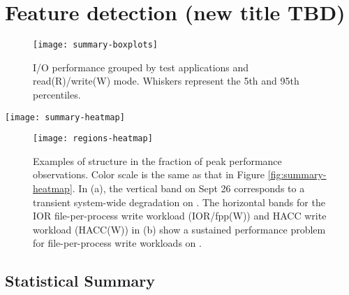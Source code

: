 \section{Feature detection (new title TBD)}  \label{sec:features}

\begin{figure}
    \centering
    \texttt{[image: summary-boxplots]}
    \vspace{-.15in}
    \caption{I/O performance grouped by test applications and read(R)/write(W) mode.  Whiskers represent the 5th and 95th percentiles.}
    \label{fig:summary-boxplots}
\end{figure}


\begin{figure*}
    \centering
    \texttt{[image: summary-heatmap]}
    \vspace{-.2in}
    \caption{Performance of daily benchmarks normalized to each benchmark's peak observed performance on the specified storage system.  The y-axis labels show combinations of system, I/O motif, and mode (Read/Write).  Grey represents days on which no observations were made.  The two regions highlighted in green boxes are expanded upon in Figure \ref{fig:regions-heatmap}.}
    \label{fig:summary-heatmap}
\end{figure*}

\begin{figure}
    \centering
    \texttt{[image: regions-heatmap]}
    \vspace{-.2in}
    \caption{Examples of structure in the fraction of peak performance observations.  Color scale is the same as that in Figure \ref{fig:summary-heatmap}.  In (a), the vertical band on Sept 26 corresponds to a transient system-wide degradation on \mira.  The horizontal bands for the IOR file-per-process write workload (IOR/fpp(W)) and HACC write workload (HACC(W)) in (b) show a sustained performance problem for file-per-process write workloads on \cori.}
    \label{fig:regions-heatmap}
\end{figure}

\subsection{Statistical Summary} \label{sec:features/summary}


